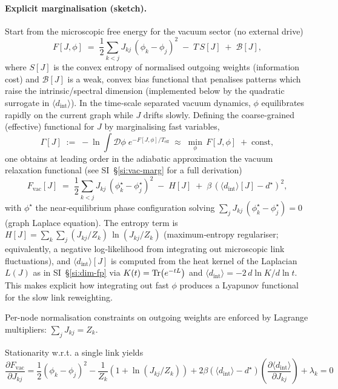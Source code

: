 \documentclass[11pt]{article}
\begin{document}
\paragraph{Explicit marginalisation (sketch).} Start from the microscopic free energy for the vacuum sector (no external drive)
\begin{equation}
  F[J,\phi] \;=\; \frac{1}{2}\sum_{k<j} J_{kj}\,(\phi_k-\phi_j)^2 \; -\; T\, S[J] \; +\; \mathcal B[J],
\end{equation}
where $S[J]$ is the convex entropy of normalised outgoing weights (information cost) and $\mathcal B[J]$ is a weak, convex bias functional that penalises patterns which raise the intrinsic/spectral dimension (implemented below by the quadratic surrogate in $\langle d_{\text{int}}\rangle$). In the time‑scale separated vacuum dynamics, $\phi$ equilibrates rapidly on the current graph while $J$ drifts slowly. Defining the coarse‑grained (effective) functional for $J$ by marginalising fast variables,
\begin{equation}
  \Gamma[J] \;:=\; -\ln \int \mathcal D\phi\; e^{-F[J,\phi]/T_\text{eff}} \;\approx\; \min_{\phi}\, F[J,\phi] \; +\; \text{const},
\end{equation}
one obtains at leading order in the adiabatic approximation the vacuum relaxation functional (see SI~\S\ref{si:vac-marg} for a full derivation)
\begin{equation}
  F_{\text{vac}}[J] \;=\; \frac{1}{2}\sum_{k<j} J_{kj}\,(\phi_k^{\star}-\phi_j^{\star})^2 \; -\; H[J] \; +\; \beta\, (\langle d_{\text{int}}\rangle[J]-d^\star)^2,
\end{equation}
with $\phi^{\star}$ the near‑equilibrium phase configuration solving $\sum_j J_{kj}\,(\phi_k^{\star}-\phi_j^{\star})=0$ (graph Laplace equation). The entropy term is $H[J]=\sum_k\sum_j (J_{kj}/Z_k)\,\ln(J_{kj}/Z_k)$ (maximum‑entropy regulariser; equivalently, a negative log‑likelihood from integrating out microscopic link fluctuations), and $\langle d_{\text{int}}\rangle[J]$ is computed from the heat kernel of the Laplacian $L(J)$ as in SI~\S\ref{si:dim-fp} via $K(t)=\Tr(e^{-tL})$ and $\langle d_{\text{int}}\rangle=-2\,d\ln K/d\ln t$. This makes explicit how integrating out fast $\phi$ produces a Lyapunov functional for the slow link reweighting.


Per-node normalisation constraints on outgoing weights are enforced by Lagrange multipliers: $\sum_j J_{kj}=Z_k$.

\medskip

Stationarity w.r.t. a single link yields
\begin{equation}
\frac{\partial F_{\text{vac}}}{\partial J_{kj}} = \frac{1}{2} (\phi_k - \phi_j)^2 - \frac{1}{Z_k}(1 + \ln(J_{kj}/Z_k)) + 2\beta (\langle d_{\text{int}} \rangle - d^\star) \left(\frac{\partial\langle d_{\text{int}} \rangle}{\partial J_{kj}}\right) + \lambda_k = 0
\end{equation}
\end{document}
